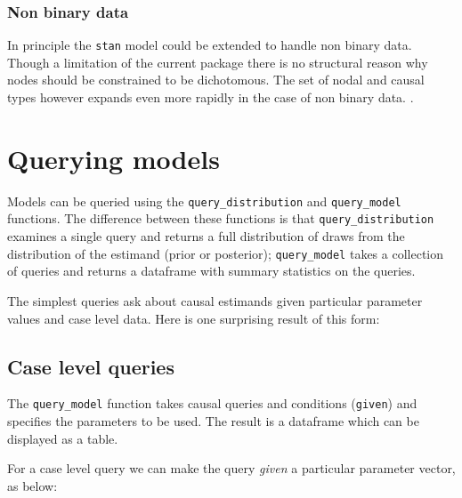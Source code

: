 \documentclass[
  12pt,
]{book}
\begin{document}
\hypertarget{non-binary-data}{%
\subsection{Non binary data}\label{non-binary-data}}

In principle the \texttt{stan} model could be extended to handle non binary data. Though a limitation of the current package there is no structural reason why nodes should be constrained to be dichotomous. The set of nodal and causal types however expands even more rapidly in the case of non binary data. .

\hypertarget{querying-models}{%
\chapter{Querying models}\label{querying-models}}

Models can be queried using the \texttt{query\_distribution} and \texttt{query\_model} functions. The difference between these functions is that \texttt{query\_distribution} examines a single query and returns a full distribution of draws from the distribution of the estimand (prior or posterior); \texttt{query\_model} takes a collection of queries and returns a dataframe with summary statistics on the queries.

The simplest queries ask about causal estimands given particular parameter values and case level data. Here is one surprising result of this form:

\hypertarget{case-level-queries}{%
\section{Case level queries}\label{case-level-queries}}

The \texttt{query\_model} function takes causal queries and conditions (\texttt{given}) and specifies the parameters to be used. The result is a dataframe which can be displayed as a table.

For a case level query we can make the query \emph{given} a particular parameter vector, as below:
\end{document}
